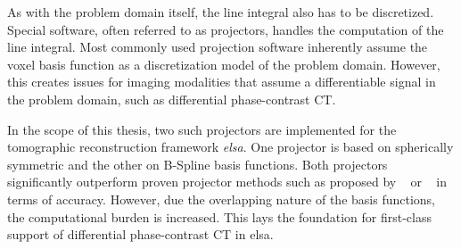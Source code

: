 As with the problem domain itself, the line integral also has to be discretized. Special software,
often referred to as projectors, handles the computation of the line integral. Most commonly used
projection software inherently assume the voxel basis function as a discretization model of the
problem domain. However, this creates issues for imaging modalities that assume a differentiable
signal in the problem domain, such as differential phase-contrast CT.

In the scope of this thesis, two such projectors are implemented for the tomographic reconstruction
framework \textit{elsa}. One projector is based on spherically symmetric and the other on B-Spline
basis functions. Both projectors significantly outperform proven projector methods such as proposed
by \citeauthor*{siddon_fast_1985}~\cite{siddon_fast_1985} or
\citeauthor*{joseph_improved_1982}~\cite{joseph_improved_1982} in terms of accuracy. However, due
the overlapping nature of the basis functions, the computational burden is increased. This lays the
foundation for first-class support of differential phase-contrast CT in elsa.
